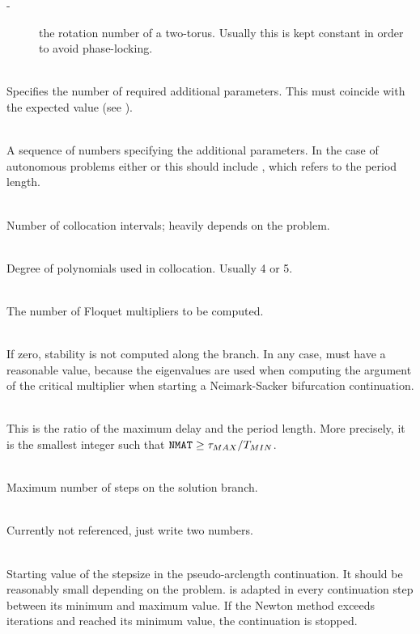 \documentclass[10pt,a4paper]{ddedoc}
\begin{document}
\begin{description}
\begin{description}
\item[ -] the rotation number of a two-torus. Usually this is kept constant in order to avoid phase-locking.
\end{description}
%
\item[\funp{NPARX}] ~\\
Specifies the number of required additional parameters. This must coincide with the expected value (see ).
%
\item[\funp{PARX}] ~\\
A sequence of numbers specifying the additional parameters. In
the case of autonomous problems either  or this should include , which refers to the period length.
%
\item[\funp{NINT}] ~\\
Number of collocation intervals; heavily depends on the problem.
%
\item[\funp{NDEG}] ~\\
Degree of polynomials used in collocation. Usually 4 or 5.
%
\item[\funp{NMUL}] ~\\
The number of Floquet multipliers to be computed.
%
\item[\funp{STAB}] ~\\
If zero, stability is not computed along the branch. In any case,  must have a reasonable value, because the eigenvalues are used when computing the argument of the critical multiplier when starting a Neimark-Sacker bifurcation continuation.
%
\item[\funp{NMAT}] ~\\
This is the ratio of the maximum delay and the period length. More precisely, it is the smallest integer such that ${\tt NMAT} \ge \tau_{MAX}/T_{MIN}$.
%
\item[\funp{STEPS}] ~\\
Maximum number of steps on the solution branch.
%
\item[\funp{CPMIN}, \funp{CPMAX}] ~\\
Currently not referenced, just write two numbers.
%
\item[\funp{DS}] ~\\
Starting value of the stepsize in the pseudo-arclength continuation.
It should be reasonably small depending on the problem.  is adapted in every continuation step between its minimum and maximum value. If the Newton method exceeds  iterations and  reached its minimum value, the continuation is stopped.
%
\item[\funp{DSMIN}, \funp{DSMAX}] ~\\

\end{description}
\end{document}
